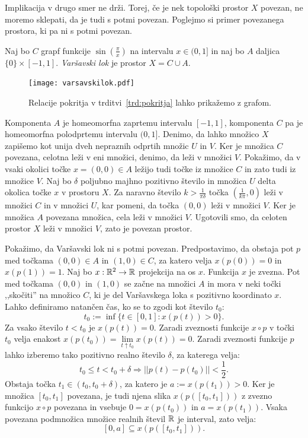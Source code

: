 \documentclass[../TG_magistrsko_delo_sections.tex]{subfiles}
\begin{document}
Implikacija v drugo smer ne drži. Torej, če je nek topološki prostor $X$ povezan, ne moremo sklepati, da je tudi s potmi povezan. Poglejmo si primer povezanega prostora, ki pa ni s potmi povezan.

\begin{definicija}
Naj bo $C$ grapf funkcije $\sin\left(\frac{\pi}{x}\right)$ na intervalu $x \in (0 , 1]$ in naj bo $A$ daljica $\{ 0 \} \times [-1 , 1]$. \emph{Varšavski lok} je prostor $X = C \cup A$.
\end{definicija}

\begin{figure}[h]
  \centering
  \texttt{[image: varsavskilok.pdf]}
  \caption[Primer vektorske slike.]{Relacije pokritja v trditvi~\ref{trd:pokritja} lahko prikažemo z grafom.}
  \label{fig:varsavski_lok}
\end{figure}


Komponenta $A$ je homeomorfna zaprtemu intervalu $[-1, 1]$, komponenta $C$ pa je homeomorfna polodprtemu intervalu $(0, 1]$. Denimo, da lahko množico $X$ zapišemo kot unija dveh nepraznih odprtih množic $U$ in $V$. Ker je množica $C$ povezana, celotna leži v eni množici, denimo, da leži v množici $V$. Pokažimo, da v vsaki okolici točke $x = (0, 0) \in  A$ ležijo tudi točke iz množice $C$ in zato tudi iz množice $V$. Naj bo $\delta$ poljubno majhno pozitivno število in množica $U$ delta okolica točke $x$ v prostoru $X$. Za naravno število $k > \frac{1}{\pi \delta}$ točka $\left(\frac{1}{k \pi}, 0\right)$ leži v množici $C$ in v množici $U$, kar pomeni, da točka $(0, 0)$ leži v množici $V$. Ker je množica $A$ povezana množica, cela leži v množici $V$. Ugotovili smo, da celoten prostor $X$ leži v množici $V$, zato je povezan prostor.

Pokažimo, da Varšavski lok ni s potmi povezan. Predpostavimo, da obstaja pot $p$ med točkama $(0, 0) \in A$ in $(1, 0) \in C$, za katero velja $x(p(0)) = 0$ in $x(p(1)) = 1$. Naj bo $x: \mathbb R^2 \to \mathbb R$ projekcija na os $x$. Funkcija $x$ je zvezna. Pot med točkama $(0, 0)$ in $(1, 0)$ se začne na množici $A$ in mora v neki točki ,,skočiti'' na množico $C$, ki je del Varšavskega loka s pozitivno koordinato $x$.   
Lahko definiramo natančen čas, ko se to zgodi kot število $t_0$:
$$t_0 := \inf\{t \in [0, 1]: x(p(t)) > 0 \}.$$
Za vsako število $t < t_0$ je $x(p(t)) = 0$. Zaradi zveznosti funkcije $x \circ p$ v točki $t_0$ velja enakost $x(p(t_0)) = \lim\limits_{t \uparrow t_0} x(p(t)) = 0$. Zaradi zveznosti funkcije $p$ lahko izberemo tako pozitivno realno število $\delta$, za katerega velja:
$$t_0 \leq t < t_0 + \delta \Rightarrow ||p(t) - p(t_0)|| < \frac{1}{2}.$$
Obstaja točka $t_1 \in (t_0, t_0 + \delta)$, za katero je $a := x(p(t_1)) >0$. Ker je množica $[t_0, t_1]$ povezana, je tudi njena slika $x(p([t_0, t_1]))$ z zvezno funkcijo $x \circ p$ povezana in vsebuje $0 = x(p(t_0))$ in $a = x(p(t_1))$. Vsaka povezana podmnožica množice realnih števil $\mathbb R$ je interval, zato velja:
$$[0, a] \subseteq x(p([t_0, t_1])).$$
\end{document}
